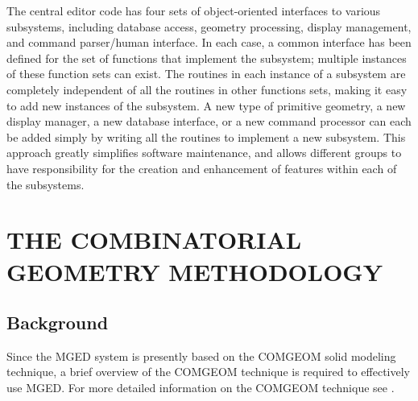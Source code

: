 The central editor code has four sets of object-oriented interfaces
to various subsystems, including database access, geometry processing,
display management, and command parser/human interface.
In each case, a common interface has been defined for the set of
functions that implement the subsystem;
multiple instances of these function sets can exist.
The routines in each instance of a subsystem are completely independent
of all the routines in other functions sets, making it easy to add new
instances of the subsystem.  A new type of primitive geometry,
a new display manager, a new database interface, or a new command
processor can each be added simply by writing all the routines
to implement a new subsystem.
This approach greatly simplifies software maintenance, and allows
different groups to have responsibility for the
creation and enhancement of features within each of the subsystems.

\chapter{THE COMBINATORIAL GEOMETRY METHODOLOGY}

\section{Background}

Since the MGED system is presently based on the COMGEOM solid modeling
technique, a brief overview of the COMGEOM technique is required
to effectively use MGED.
For more detailed information on the COMGEOM technique see
\cite{gift1,gift2}.

